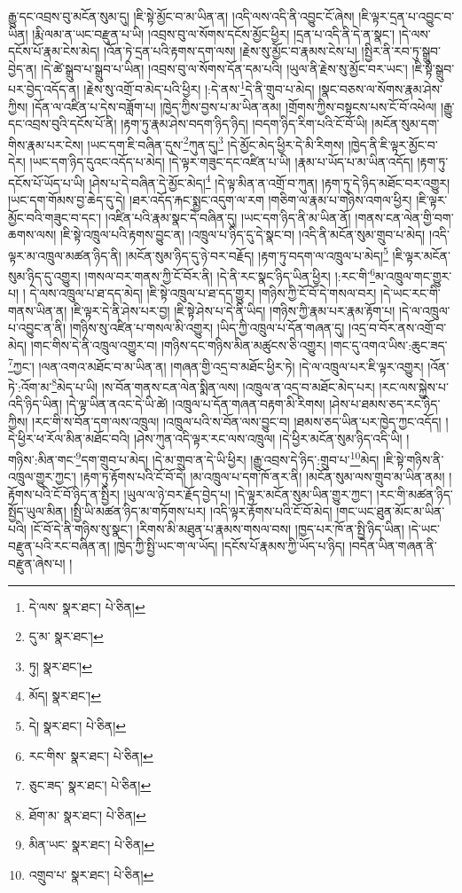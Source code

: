 རྒྱུ་དང་འབྲས་བུ་མངོན་སུམ་དུ། །ཇི་སྟེ་མྱོང་བ་མ་ཡིན་ན། །འདི་ལས་འདི་ནི་འབྱུང་ངོ་ཞེས། །ཇི་ལྟར་དྲན་པ་འབྱུང་བ་ཡིན། །རྨི་ལམ་ན་ཡང་བརྫུན་པ་ཡི། །འབྲས་བུ་ལ་སོགས་དངོས་མྱོང་ཕྱིར། །དྲན་པ་འདི་ནི་དེ་ན་སྣང་། །དེ་ལས་དངོས་པོ་རྣམ་ངེས་མེད། །འོན་ཏེ་དྲན་པའི་རྟགས་དག་ལས། །རྗེས་སུ་མྱོང་བ་རྣམས་ངེས་པ། །སྤྱིར་ནི་རབ་ཏུ་སྒྲུབ་བྱེད་ན། །དེ་ཚེ་སྒྲུབ་པ་སྒྲུབ་པ་ཡིན། །འབྲས་བུ་ལ་སོགས་དོན་དམ་པའི། །ཡུལ་ནི་རྗེས་སུ་མྱོང་བར་ཡང་། །ཇི་སྟེ་སྒྲུབ་པར་བྱེད་འདོད་ན། །རྗེས་སུ་འགྲོ་བ་མེད་པའི་ཕྱིར། །:དེ་ནས་\footnote{དེ་ལས་  སྣར་ཐང་།  པེ་ཅིན། }དེ་ནི་གྲུབ་པ་མེད། །སྣང་བཅས་ལ་སོགས་རྣམ་ཤེས་ཀྱིས། །དོན་ལ་འཛིན་པ་དེས་བཟློག་པ། །ཁྱེད་ཀྱིས་བྱས་པ་མ་ཡིན་ནམ། །གྲོགས་ཀྱིས་བསྟངས་པས་ངོ་བོ་འཕེལ། །རྒྱུ་དང་འབྲས་བུའི་དངོས་པོ་ནི། །རྟག་ཏུ་རྣམ་ཤེས་བདག་ཉིད་ཉིད། །བདག་ཉིད་རིག་པའི་ངོ་བོ་ཡི། །མངོན་སུམ་དག་གིས་རྣམ་པར་ངེས། །ཡང་དག་ཇི་བཞིན་དུས་\footnote{དུ་མ་  སྣར་ཐང་། }ཀུན་དུ།\footnote{ཏུ།  སྣར་ཐང་། } །དེ་མྱོང་མེད་ཕྱིར་དེ་མི་རིགས། །ཁྱེད་ནི་ཇི་ལྟར་མྱོང་བ་དེར། །ཡང་དག་ཉིད་དུའང་འདོད་པ་མེད། །དེ་ལྟར་གཟུང་དང་འཛིན་པ་ཡི། །རྣམ་པ་ཡོད་པ་མ་ཡིན་འདོད། །རྟག་ཏུ་དངོས་པོ་ཡོད་པ་ཡི། །ཤེས་པ་དེ་བཞིན་དེ་མྱོང་མེད།\footnote{མོད།  སྣར་ཐང་། } །དེ་ལྟ་མིན་ན་འགྲོ་བ་ཀུན། །རྟག་ཏུ་དེ་ཉིད་མཐོང་བར་འགྱུར། །ཡང་དག་གོམས་བྱ་ཆེད་དུ་དེ། །ཐར་འདོད་རྐང་སྨྱང་འདུག་ལ་རག །གཅིག་ལ་རྣམ་པ་གཉིས་འགལ་ཕྱིར། །ཇི་ལྟར་མྱོང་བའི་གཟུང་བ་དང་། །འཛིན་པའི་རྣམ་སྣང་དེ་བཞིན་དུ། །ཡང་དག་ཉིད་ནི་མ་ཡིན་ནོ། །གནས་ངན་ལེན་གྱི་བག་ཆགས་ལས། །ཇི་སྟེ་འཁྲུལ་པའི་རྟགས་བྱུང་ན། །འཁྲུལ་པ་ཉིད་དུ་དེ་སྣང་བ། །འདི་ནི་མངོན་སུམ་གྲུབ་པ་མེད། །འདི་ལྟར་མ་འཁྲུལ་མཚན་ཉིད་ནི། །མངོན་སུམ་ཉིད་དུ་ཉེ་བར་བརྗོད། །རྟག་ཏུ་བདག་ལ་འཁྲུལ་པ་མེད།\footnote{དེ།  སྣར་ཐང་།  པེ་ཅིན། } །ཇི་ལྟར་མངོན་སུམ་ཉིད་དུ་འགྱུར། །གསལ་བར་གནས་ཀྱི་ངོ་བོར་ནི། །དེ་ནི་རང་སྣང་ཉིད་ཡིན་ཕྱིར། །:རང་གི་\footnote{རང་གིས་  སྣར་ཐང་།  པེ་ཅིན། }མ་འཁྲུལ་གང་གྱུར་པ། །
དེ་ལས་འཁྲུལ་པ་ཐ་དད་མེད། །ཇི་སྟེ་འཁྲུལ་པ་ཐ་དད་གྱུར། །གཉིས་ཀྱི་ངོ་བོ་དེ་གསལ་བར། །དེ་ཡང་རང་གི་གནས་ཡིན་ན། །ཇི་ལྟར་དེ་ནི་ཤེས་པར་བྱ། །ཇི་སྟེ་ཤེས་པ་དེ་ནི་ཡིད། །གཉིས་ཀྱི་རྣམ་པར་རྣམ་རྟོག་པ། །དེ་ལ་འཁྲུལ་པ་འབྱུང་ན་ནི། །གཉིས་སུ་འཛིན་པ་གསལ་མི་འགྱུར། །ཡིད་ཀྱི་འཁྲུལ་པ་དོན་གཞན་དུ། །འདྲ་བ་བོར་ནས་འགྲོ་བ་མེད། །གང་གིས་དེ་ནི་འཁྲུལ་འགྱུར་བ། །གཉིས་དང་གཉིས་མིན་མཚུངས་ཅི་འགྱུར། །གང་དུ་འགའ་ཡིས་:ཆུང་ཟད་\footnote{ཅུང་ཟད་  སྣར་ཐང་།  པེ་ཅིན། }ཀྱང་། །ལན་འགའ་མཐོང་བ་མ་ཡིན་ན། །གཞན་གྱི་འདྲ་བ་མཐོང་ཕྱིར་ཏེ། །དེ་ལ་འཁྲུལ་པར་ཇི་ལྟར་འགྱུར། །འོན་ཏེ་:འོག་མ་\footnote{ཐོག་མ་  སྣར་ཐང་།  པེ་ཅིན། }མེད་པ་ཡི། །ས་བོན་གནས་ངན་ལེན་སྨིན་ལས། །འཁྲུལ་ན་འདྲ་བ་མཐོང་མེད་པར། །རང་ལས་སྐྱེས་པ་འདི་ཉིད་ཡིན། །དེ་ལྟ་ཡིན་ནའང་དེ་ཡི་ཚེ། །འཁྲུལ་པ་དོན་གཞན་བརྟག་མི་རིགས། །ཤེས་པ་ཐམས་ཅད་རང་ཉིད་ཀྱིས། །རང་གི་ས་བོན་དག་ལས་འཁྲུལ། །འཁྲུལ་པའི་ས་བོན་ལས་བྱུང་བ། །ཐམས་ཅད་ཡིན་པར་ཁྱེད་ཀྱང་འདོད། །དེ་ཕྱིར་ཕ་རོལ་མིན་མཐོང་བའི། །ཤེས་ཀུན་འདི་ལྟར་རང་ལས་འཁྲུལ། །དེ་ཕྱིར་མངོན་སུམ་ཉིད་འདི་ཡི། །གཉིས་:མིན་གང་\footnote{མིན་ཡང་  སྣར་ཐང་།  པེ་ཅིན། }དག་གྲུབ་པ་མེད། །དེ་མ་གྲུབ་ན་དེ་ཡི་ཕྱིར། །རྒྱུ་འབྲས་དེ་ཉིད་:གྲུབ་པ་\footnote{འགྲུབ་པ་  སྣར་ཐང་།  པེ་ཅིན། }མེད། །ཇི་སྟེ་གཉིས་ནི་འཁྲུལ་གྱུར་ཀྱང་། །རྟག་ཏུ་རྟོགས་པའི་ངོ་བོ་དེ། །མ་འཁྲུལ་པ་དག་ཁོ་ནར་ནི། །མངོན་སུམ་ལས་གྲུབ་མ་ཡིན་ནམ། །རྟོགས་པའི་ངོ་བོ་ཉིད་ན་སྤྱིར། །ཡུལ་ལ་ཉེ་བར་རྗོད་བྱེད་པ། །དེ་ལྟར་མངོན་སུམ་ཡིན་གྱུར་ཀྱང་། །རང་གི་མཚན་ཉིད་སྤྱོད་ཡུལ་མིན། །སྤྱི་ཡི་མཚན་ཉིད་མ་གཏོགས་པར། །འདི་ལྟར་རྟོགས་པའི་ངོ་བོ་མེད། །གང་ཡང་ཐུན་མོང་མ་ཡིན་པའི། །ངོ་བོ་དེ་ནི་གཉིས་སུ་སྣང་། །རིགས་མི་མཐུན་པ་རྣམས་གསལ་བས། །ཁྱད་པར་ཁོ་ན་སྤྱི་ཉིད་ཡིན། །དེ་ཡང་བརྫུན་པའི་རང་བཞིན་ན། །ཁྱེད་ཀྱི་སྤྱི་ཡང་ག་ལ་ཡོད། །དངོས་པོ་རྣམས་ཀྱི་ཡོད་པ་ཉིད། །བདེན་ཡིན་གཞན་ནི་བརྫུན་ཞེས་པ། །
